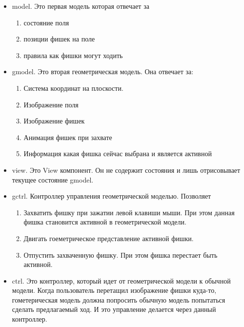 \begin{itemize}
\item model.
Это первая модель которая отвечает за
\begin{enumerate}
\item состояние поля

\item позиции фишек на поле

\item правила как фишки могут ходить
\end{enumerate}

\item gmodel.
Это вторая геометрическая модель.
Она отвечает за:
\begin{enumerate}
\item Система координат на плоскости.

\item Изображение поля

\item Изображение фишек

\item Анимация фишек при захвате

\item Информация какая фишка сейчас выбрана и является активной
\end{enumerate}

\item view.
Это View компонент.
Он не содержит состояния и лишь отрисовывает текущее состояние gmodel.

\item gctrl.
Контроллер управления геометрической моделью.
Позволяет
\begin{enumerate}
\item Захватить фишку при зажатии левой клавиши мыши.
При этом данная фишка становится активной в геометрической модели.

\item Двигать гоеметрическое представление активной фишки.

\item Отпустить захваченную фишку.
При этом фишка перестает быть активной.
\end{enumerate}

\item ctrl.
Это контроллер, который идет от геометрической модели к обычной модели.
Когда пользователь перетащил изображение фишки куда-то, гометерическая модель должна попросить обычную модель попытаться сделать предлагаемый ход.
И это управление делается через данный контроллер.
\end{itemize}
